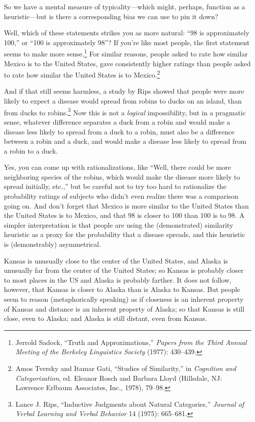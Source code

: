 {
 So we have a mental measure of typicality---which might, perhaps,
function as a heuristic---but is there a corresponding bias we can use
to pin it down?}

{
 Well, which of these statements strikes you as more natural:
``98 is approximately 100,'' or
``100 is approximately 98''? If
you're like most people, the first statement seems to
make more sense.\footnote{Jerrold Sadock, ``Truth and
Approximations,'' \textit{Papers from the Third
Annual Meeting of the Berkeley Linguistics Society} (1977): 430--439.} For similar reasons, people asked
to rate how similar Mexico is to the United States, gave consistently
higher ratings than people asked to rate how similar the United States
is to Mexico.\footnote{Amos Tversky and Itamar Gati, ``Studies of
Similarity,'' in \textit{Cognition and
Categorization}, ed. Eleanor Rosch and Barbara Lloyd (Hillsdale, NJ:
Lawrence Erlbaum Associates, Inc., 1978), 79--98.}}

{
 And if that still seems harmless, a study by Rips showed that
people were more likely to expect a disease would spread from robins to
ducks on an island, than from ducks to robins.\footnote{Lance J. Rips, ``Inductive Judgments about
Natural Categories,'' \textit{Journal of Verbal
Learning and Verbal Behavior} 14 (1975): 665--681.} Now
this is not a \textit{logical} impossibility, but in a pragmatic sense,
whatever difference separates a duck from a robin and would make a
disease less likely to spread from a duck to a robin, must also be a
difference between a robin and a duck, and would make a disease less
likely to spread from a robin to a duck.}

{
 Yes, you can come up with rationalizations, like
``Well, there could be more neighboring species of the
robins, which would make the disease more likely to spread initially,
etc.,'' but be careful not to try too hard to
rationalize the probability ratings of subjects who
didn't even realize there was a comparison going on.
And don't forget that Mexico is more similar to the
United States than the United States is to Mexico, and that 98 is
closer to 100 than 100 is to 98. A simpler interpretation is that
people are using the (demonstrated) similarity heuristic as a proxy for
the probability that a disease spreads, and this heuristic is
(demonstrably) asymmetrical.}

{
 Kansas is unusually close to the center of the United States, and
Alaska is unusually far from the center of the United States; so Kansas
is probably closer to most places in the US and Alaska is probably
farther. It does not follow, however, that Kansas is closer to Alaska
than is Alaska to Kansas. But people seem to reason (metaphorically
speaking) as if closeness is an inherent property of Kansas and
distance is an inherent property of Alaska; so that Kansas is still
close, even to Alaska; and Alaska is still distant, even from Kansas.}

